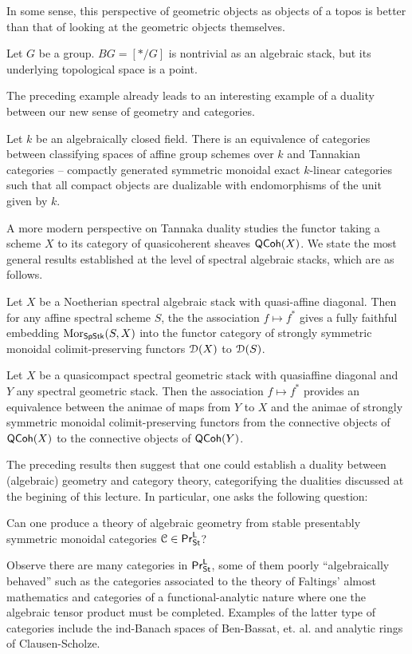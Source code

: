 In some sense, this perspective of geometric objects as objects of a topos is better than that of looking at the geometric objects themselves. 
\begin{example}\label{ex: BG}
    Let $G$ be a group. $BG=[*/G]$ is nontrivial as an algebraic stack, but its underlying topological space is a point. 
\end{example}
The preceding example already leads to an interesting example of a duality between our new sense of geometry and categories. 
\begin{example}\label{ex: Tannaka duality}
    Let $k$ be an algebraically closed field. There is an equivalence of categories between classifying spaces of affine group schemes over $k$ and Tannakian categories -- compactly generated symmetric monoidal exact $k$-linear categories such that all compact objects are dualizable with endomorphisms of the unit given by $k$. 
\end{example}
A more modern perspective on Tannaka duality studies the functor taking a scheme $X$ to its category of quasicoherent sheaves $\mathsf{QCoh}(X)$. We state the most general results established at the level of spectral algebraic stacks, which are as follows. 
\begin{theorem}\label{thm: Tannaka BHL}
    Let $X$ be a Noetherian spectral algebraic stack with quasi-affine diagonal. Then for any affine spectral scheme $S$, the the association $f\mapsto f^{*}$ gives a fully faithful embedding $\mathrm{Mor}_{\mathsf{SpStk}}(S,X)$ into the functor category of strongly symmetric monoidal colimit-preserving functors $\EuScript{D}(X)$ to $\EuScript{D}(S)$. 
\end{theorem}
\begin{theorem}
    Let $X$ be a quasicompact spectral geometric stack with quasiaffine diagonal and $Y$ any spectral geometric stack. Then the association $f\mapsto f^{*}$ provides an equivalence between the animae of maps from $Y$ to $X$ and the animae of strongly symmetric monoidal colimit-preserving functors from the connective objects of $\mathsf{QCoh}(X)$ to the connective objects of $\mathsf{QCoh}(Y)$. 
\end{theorem}

The preceding results then suggest that one could establish a duality between (algebraic) geometry and category theory, categorifying the dualities discussed at the begining of this lecture. In particular, one asks the following question:
\begin{question}
    Can one produce a theory of algebraic geometry from stable presentably symmetric monoidal categories $\EuScript{C}\in\mathsf{Pr}^{\mathsf{L}}_{\mathsf{St}}$? 
\end{question}
Observe there are many categories in $\mathsf{Pr}^{\mathsf{L}}_{\mathsf{St}}$, some of them poorly ``algebraically behaved'' such as the categories associated to the theory of Faltings' almost mathematics and categories of a functional-analytic nature where one the algebraic tensor product must be completed. Examples of the latter type of categories include the ind-Banach spaces of Ben-Bassat, et. al. and analytic rings of Clausen-Scholze. 

